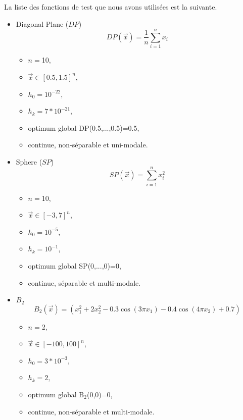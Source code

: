 \vspace{2em}La liste des fonctions de test que nous avons utilisées est la suivante\cite{Momin_Yang_2013}.
\begin{itemize}
	\item
	Diagonal Plane ($DP$)\\$$DP(\overrightarrow{x})=\frac{1}{n}\sum_{i=1}^{n} x_i$$
	
	\begin{itemize}[label={$\circ$}]
		\item $n=$10, 
		\item $\overrightarrow{x} \in [0.5,1.5]^n$,
		\item $h_0=10^{-22}$,
		\item $h_k=7*10^{-21}$,
		\item optimum global DP(0.5,...,0.5)=0.5,
		\item continue, non-séparable et uni-modale.
	\end{itemize}
	
	\bigskip
	\bigskip
	\item
	Sphere ($SP$)\\$$SP(\overrightarrow{x})=\sum_{i=1}^{n} x_i^2$$

	\begin{itemize}[label={$\circ$}]  
		\item $n=$10, 
		\item $\overrightarrow{x} \in [-3,7]^n$,
		\item $h_0=10^{-5}$,
		\item $h_k=10^{-1}$,
		\item optimum global SP(0,...,0)=0,
		\item continue, séparable et multi-modale.
	\end{itemize}
	
	\bigskip
	\bigskip
	\item
	$B_2$\\$$B_2(\overrightarrow{x})=(x_1^2+2x_2^2-0.3\cos(3\pi x_1)-0.4\cos(4\pi x_2)+0.7)$$

	\begin{itemize}[label={$\circ$}]
		\item $n=$2,
		\item $\overrightarrow{x} \in [-100,100]^n$,
		\item $h_0=3*10^{-3}$,
		\item $h_k=2$,
		\item optimum global B$_2$(0,0)=0,
		\item continue, non-séparable et multi-modale.
	\end{itemize}
	

\end{itemize}

